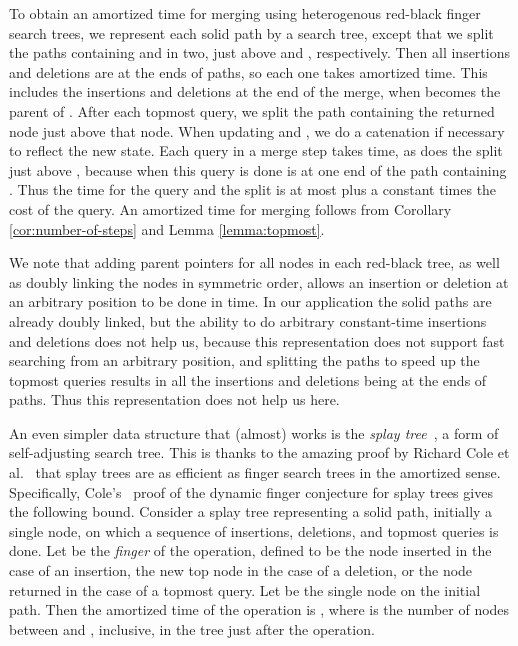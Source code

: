 \documentclass[twoside,leqno,twocolumn]{article}
\begin{document}
To obtain an  amortized time for merging using heterogenous red-black finger search trees, we represent each solid path by a search tree, except that we split the paths containing  and  in two, just above  and , respectively.  Then all insertions and deletions are at the ends of paths, so each one takes  amortized time. This includes the insertions and deletions at the end of the merge, when  becomes the parent of . After each topmost query, we split the path containing the returned node just above that node.  When updating  and , we do a catenation if necessary to reflect the new state.  Each query  in a merge step takes  time, as does the split just above , because when this query is done  is at one end of the path containing . Thus the time for the query and the split is at most  plus a constant times the cost of the query. An  amortized time for merging follows from Corollary \ref{cor:number-of-steps} and Lemma \ref{lemma:topmost}.

We note that adding parent pointers for all nodes in each red-black tree, as well as doubly linking the nodes in symmetric order, allows an insertion or deletion at an arbitrary position to be done in  time.  In our application the solid paths are already doubly linked, but the ability to do arbitrary constant-time insertions and deletions does not help us, because this representation does not support fast searching from an arbitrary position, and splitting the paths to speed up the topmost queries results in all the insertions and deletions being at the ends of paths.  Thus this representation does not help us here. 

An even simpler data structure that (almost) works is the \emph{splay tree}~\cite{ST85}, a form of self-adjusting search tree.  This is thanks to the amazing proof by Richard Cole et al.~\cite{dynamic_finger:c00,dynamic_finger:cmss00} that splay trees are as efficient as finger search trees in the amortized sense.  Specifically, Cole's~\cite{dynamic_finger:c00} proof of the dynamic finger conjecture for splay trees gives the following bound.  Consider a splay tree representing a solid path, initially a single node, on which a sequence of insertions, deletions, and topmost queries is done.  Let  be the \emph{finger} of the  operation, defined to be the node inserted in the case of an insertion, the new top node in the case of a deletion, or the node returned in the case of a topmost query.  Let  be the single node on the initial path.  Then the amortized time of the  operation is , where  is the number of nodes between  and , inclusive, in the tree just after the operation.
\end{document}
